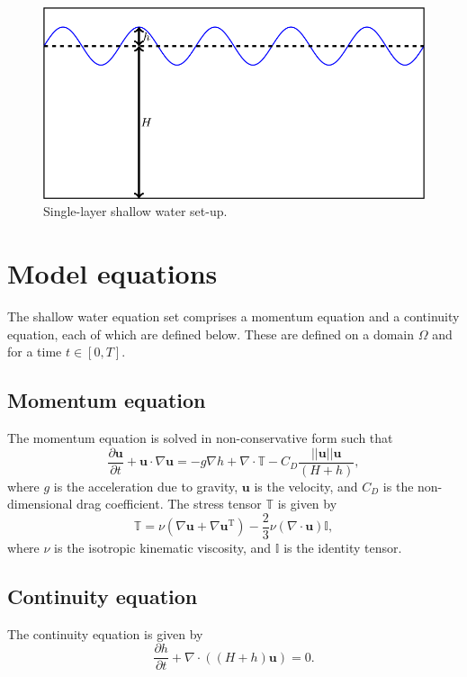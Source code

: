 \documentclass[a4paper,11pt]{report}
\begin{document}
\begin{figure}
   \centering
   \includegraphics[width=0.6\columnwidth]{images/shallow_water_h_H.png}
   \caption{Single-layer shallow water set-up.}
   \label{fig:shallow_water_setup}
\end{figure}

\section{Model equations}
The shallow water equation set comprises a momentum equation and a continuity equation, each of which are defined below. These are defined on a domain $\Omega$ and for a time $t \in [0, T]$.

\subsection{Momentum equation}
The momentum equation is solved in non-conservative form such that
\begin{equation}
   \frac{\partial \mathbf{u}}{\partial t} + \mathbf{u}\cdot\nabla\mathbf{u} = -g\nabla h + \nabla\cdot\mathbb{T} - C_D\frac{||\mathbf{u}||\mathbf{u}}{(H + h)},
\end{equation}
where $g$ is the acceleration due to gravity, $\mathbf{u}$ is the velocity, and $C_D$ is the non-dimensional drag coefficient. The stress tensor $\mathbb{T}$ is given by 
\begin{equation}
   \mathbb{T} = \nu\left(\nabla\mathbf{u} + \nabla\mathbf{u}^{\mathrm{T}}\right) - \frac{2}{3}\nu\left(\nabla\cdot\mathbf{u}\right)\mathbb{I},
\end{equation}
where $\nu$ is the isotropic kinematic viscosity, and $\mathbb{I}$ is the identity tensor.

\subsection{Continuity equation}
The continuity equation is given by
\begin{equation}
   \frac{\partial h}{\partial t} + \nabla\cdot\left(\left(H + h\right)\mathbf{u}\right) = 0.
\end{equation}
\end{document}
